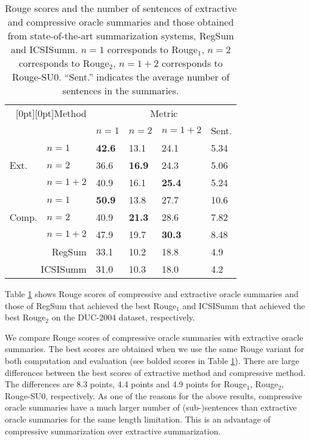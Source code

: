 \documentclass[11pt,a4paper]{article}
\begin{document}
\begin{table}[tb]
 \begin{center}
  {\tabcolsep=0.95mm
  \begin{tabular}{ll|llll}
   \multicolumn{2}{r|}{\raisebox{-1.8ex}[0pt][0pt]{Method}} & \multicolumn{4}{c}{Metric}\\
                              &                            &  $n{=}1$ & $n{=}2$ & $n{=}1{+}2$ & Sent.\\ 
	   \hline
         & $n{=}1$ & {\bf 42.6} & 13.1 & 24.1 & 5.34\\
   Ext.  & $n{=}2$ & 36.6 & {\bf 16.9} & 24.3 & 5.06\\
         & $n{=}1{+}2$ & 40.9 & 16.1 & {\bf 25.4} & 5.24\\
   \hline
         & $n{=}1$ & {\bf 50.9} & 13.8 & 27.7 & 10.6\\
   Comp. & $n{=}2$ & 40.9 & {\bf 21.3} & 28.6 & 7.82\\
         & $n{=}1{+}2$ & 47.9 & 19.7 & {\bf 30.3} & 8.48\\
   \hline
   \multicolumn{2}{r|}{RegSum} & 33.1 & 10.2 & 18.8 & 4.9\\
   \multicolumn{2}{r|}{ICSISumm} & 31.0 & 10.3 & 18.0 & 4.2\\
  \end{tabular}
  }
  \caption{{\sc Rouge} scores and the number of sentences of extractive and compressive oracle
  summaries and those obtained from state-of-the-art summarization
  systems, RegSum   and ICSISumm. $n{=1}$
  corresponds to {\sc Rouge}$_1$, $n{=}2$ corresponds to
  {\sc Rouge}$_2$, $n{=}1{+}2$ corresponds to {\sc Rouge}-SU0. ``Sent.''
  indicates the average number of sentences in the summaries.}
  \label{oracle_rouge}
 \end{center}
\end{table}


Table \ref{oracle_rouge} shows {\sc Rouge} scores of compressive and 
extractive oracle summaries and those of RegSum
\citep{hong-nenkova:2014:EACL} that achieved the best {\sc Rouge}$_1$ and ICSISumm
\citep{gillick-favre:2009:ILPNLP,gillick:tac:09} that achieved the best 
{\sc Rouge}$_2$ on the DUC-2004 dataset, respectively. 


We compare {\sc Rouge} scores of compressive oracle summaries with
 extractive oracle summaries. 
 The best scores are obtained when we use the same {\sc Rouge} variant
 for both computation and evaluation
(see bolded scores in Table \ref{oracle_rouge}).
There are large differences between the best scores of extractive method and compressive method. 
The differences are 8.3 points, 4.4 points and 4.9 points for {\sc
 Rouge}$_1$, {\sc Rouge}$_2$, {\sc Rouge}-SU0, respectively.
As one of the reasons for the above results, 
compressive oracle summaries have a much
 larger number of (sub-)sentences than extractive oracle summaries for the
 same length limitation.
This is an advantage of compressive summarization over extractive
summarization.
\end{document}
